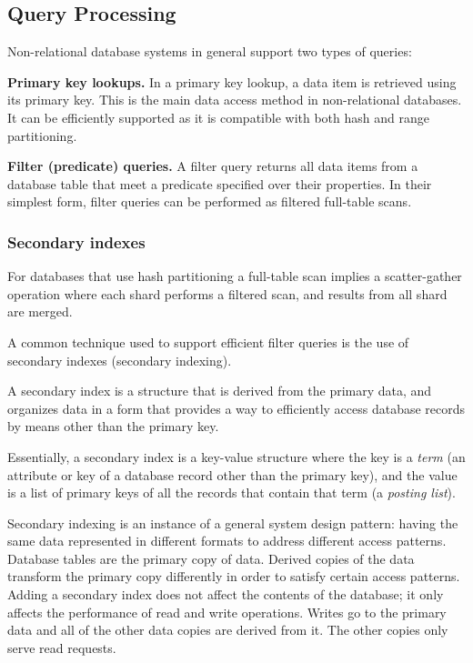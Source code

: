 \subsection{Query Processing}

Non-relational database systems in general support two types of queries:

\bigskip
\noindent
\textbf{Primary key lookups.}
In a primary key lookup, a data item is retrieved using its primary key.
This is the main data access method in non-relational databases.
It can be efficiently supported as it is compatible with both hash and range partitioning.

\bigskip
\noindent
\textbf{Filter (predicate) queries.}
A filter query returns all data items from a database table that meet a predicate specified over their properties.
In their simplest form, filter queries can be performed as filtered full-table scans.

\subsubsection{Secondary indexes}
For databases that use hash partitioning a full-table scan implies a scatter-gather operation where each shard
performs a filtered scan, and results from all shard are merged.

A common technique used to support efficient filter queries is the use of secondary indexes (secondary indexing).

A secondary index is a structure that is derived from the primary data, and organizes data in a form that
provides a way to efficiently access database records by means other than the primary key.

Essentially, a secondary index is a key-value structure where the key is a \textit{term} (an attribute or key of a
database record other than the primary key),
and the value is a list of primary keys of all the records that contain that term (a \textit{posting list}).

Secondary indexing is an instance of a general system design pattern:
having the same data represented in different formats to address different access patterns.
Database tables are the primary copy of data.
Derived copies of the data transform the primary copy differently in order to satisfy certain access patterns.
Adding a secondary index does not affect the contents of the database;
it only affects the performance of read and write operations.
Writes go to the primary data and all of the other data copies are derived from it.
The other copies only serve read requests.


